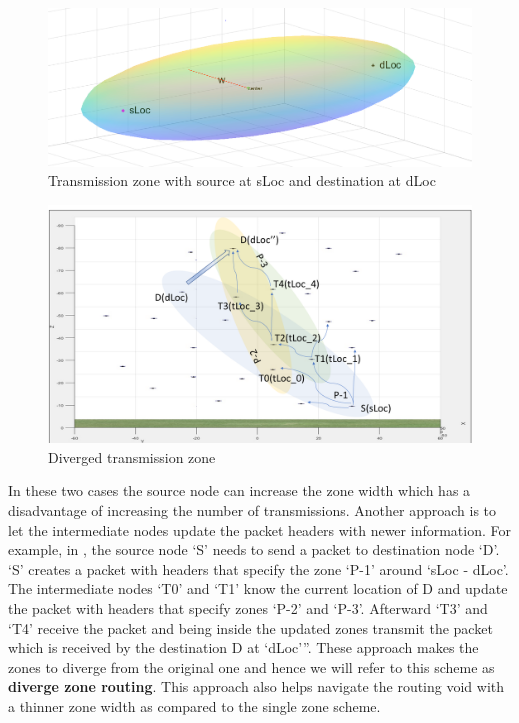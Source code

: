 \begin{figure}[hbtp]
\centering
\includegraphics[width=1\textwidth]{Chapter-4/figs/Spheroid}
\caption{Transmission zone with source at sLoc and destination at dLoc}
\label{fig:spheroid}
\end{figure}

\begin{figure}[hbtp]
    \centering
    \includegraphics[width=1\textwidth]{Chapter-4/figs/diverge_zone}
    \caption{Diverged transmission zone}
    \label{fig:diverged_transmission_zone}
\end{figure}

In these two cases the source node can increase the zone width which has a disadvantage of increasing the number of transmissions. Another approach is to let the intermediate nodes update the packet headers with newer information. For example, in , the source node `S' needs to send a packet to destination node `D'. `S' creates a packet with headers that specify the zone `P-1' around `sLoc - dLoc'. The intermediate nodes `T0' and `T1' know the current location of D and update the packet with headers that specify zones `P-2' and  `P-3'. Afterward `T3' and `T4' receive the packet and being inside the updated zones transmit the packet which is received by the destination D at `dLoc'''. These approach makes the zones to diverge from the original one and hence we will refer to this scheme as \textbf{diverge zone routing}. This approach also helps navigate the routing void with a thinner zone width as compared to the single zone scheme. 

